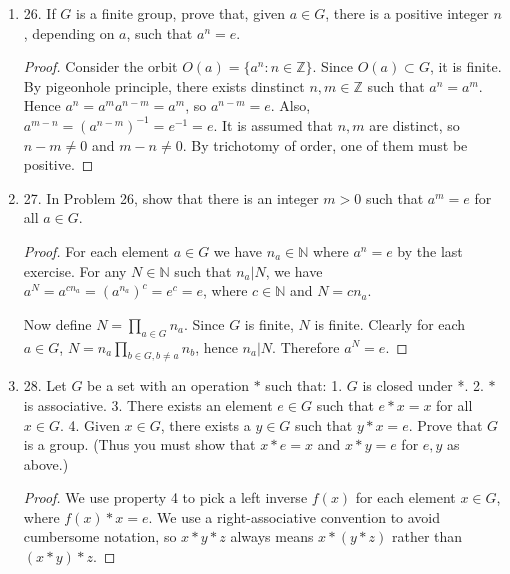 \begin{enumerate}
\begin{proof}
Now $a_2^{-1} = \left( a_1^{-1} \right) ^{-1} = a_1$ by Exercise 17. Continue in this fashion, we see that $a_3$ must have a inverse in $a_4, \ldots, a_n$, which we without loss of generality call $a_4$. In each step we consume two elements of $a_1, \ldots, a_n$. For the process to terminate without contradiction, $n$ must be even. Therefore $e, a_1, \ldots, a_n$ has an odd number of elements. Since it is assumed that  $G$ has even order, we have a contradiction.
\end{proof}

\item 26. If $G$ is a finite group, prove that, given $a \in G$, there is a positive integer $n$, depending on $a$, such that $a^n=e$.
\begin{proof}
Consider the orbit $O(a)=\{a^n : n \in \mathbb{Z}\} $. Since $O(a) \subset G$, it is finite. By pigeonhole principle, there exists dinstinct $n, m \in \mathbb{Z}$ such that $a^n = a^m$. Hence $a^n = a^m a^{n-m} = a^m$, so $a^{n-m} = e$. Also, $a^{m-n} = \left( a^{n-m} \right) ^{-1} = e^{-1} = e$. It is assumed that $n, m$ are distinct, so $n-m \neq  0$ and $m-n \neq 0$. By trichotomy of order, one of them must be positive.
\end{proof}

\item 27. In Problem 26, show that there is an integer $m>0$ such that $a^m=e$ for all $a \in G$.
\begin{proof}
For each element $a \in G$ we have $n_a \in \mathbb{N}$ where $a^n = e$ by the last exercise. For any $N \in \mathbb{N}$ such that $n_a | N$, we have $a^{N} = a^{cn_a} = \left( a^{n_a} \right) ^c = e^c = e$, where $c \in \mathbb{N}$ and $N = c n_a$.

Now define $N = \prod_{a \in G} n_a  $. Since $G$ is finite, $N$ is finite. Clearly for each $a \in G$, $N = n_a \prod_{b \in G, b\neq a} n_b  $, hence $n_a | N$. Therefore $a^N = e$.
\end{proof}

\item 28. Let $G$ be a set with an operation $*$ such that:
1. $G$ is closed under *.
2. $*$ is associative.
3. There exists an element $e \in G$ such that $e * x=x$ for all $x \in G$.
4. Given $x \in G$, there exists a $y \in G$ such that $y * x=e$.
Prove that $G$ is a group. (Thus you must show that $x * e=x$ and $x * y=e$ for $e, y$ as above.) 
\begin{proof}
	We use property 4 to pick a left inverse $f(x)$ for each element $x \in G$, where $f(x) * x = e$. We use a right-associative convention to avoid cumbersome notation, so $x*y*z$ always means $x*(y*z)$ rather than $(x*y)*z$.


\end{proof}
\end{enumerate}
